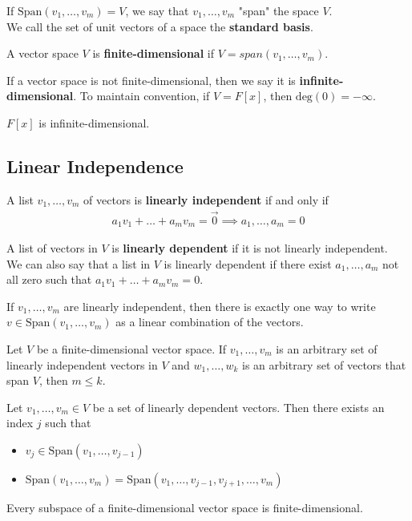 \documentclass{memoir}
\begin{document}
If $\text{Span}(v_1,\ldots,v_m) = V$, we say that $v_1,\ldots,v_m$ "span" the space $V$. \\

We call the set of unit vectors of a space the \textbf{standard basis}.
\begin{defn}
	A vector space $V$ is \textbf{finite-dimensional} if $V = span(v_1,\ldots,v_m)$.
\end{defn}
If a vector space is not finite-dimensional, then we say it is \textbf{infinite-dimensional}. To maintain convention, if \(V = F[x]\), then \(\textrm{deg}(0) = -\infty\).
\begin{thm}
	\(F[x]\) is infinite-dimensional.
\end{thm}

\subsection{Linear Independence}
\begin{defn}
	A list $v_1,\ldots,v_m$ of vectors is \textbf{linearly independent} if and only if
	\begin{align*}
	a_1v_1+\ldots+a_mv_m = \vec{0}\implies a_1,\ldots,a_m = 0
	\end{align*}
	
\end{defn}
	A list of vectors in $V$ is \textbf{linearly dependent} if it is not linearly independent.\\

	We can also say that a list in $V$ is linearly dependent if there exist $a_1,\ldots,a_m$ not all zero such that $a_1v_1+\ldots+a_mv_m = 0$.

\begin{lemma}
	If \(v_1,\ldots,v_m\) are linearly independent, then there is exactly one way to write $v \in \text{Span}(v_1,\ldots,v_m)$ as a linear combination of the vectors.
\end{lemma}
\begin{thm}
Let $V$ be a finite-dimensional vector space. If \(v_1,\ldots,v_m\) is an arbitrary set of linearly independent vectors in \(V\) and \(w_1,\ldots,w_k\) is an arbitrary set of vectors that span \(V\), then \(m\leq k\).

\end{thm}
\begin{lemma}
	Let $v_1,\ldots,v_m \in V$ be a set of linearly dependent vectors. Then there exists an index $j$ such that \begin{itemize}
		\item $v_j \in \text{Span}(v_1,\ldots,v_{j-1})$ 
		\item $\text{Span}(v_1,\ldots,v_m) = \text{Span}(v_1,\ldots,v_{j-1},v_{j+1},\ldots,v_m)$ 
	\end{itemize}
\end{lemma}
\begin{lemma}
	Every subspace of a finite-dimensional vector space is finite-dimensional.
\end{lemma}
\end{document}
